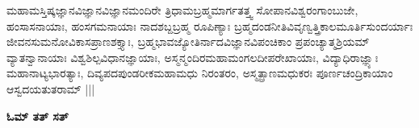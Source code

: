 ಮಹಾಮಸ್ತಿಷ್ಕಜ್ಞಾನವಿಜ್ಞಾನವಿಜ್ಞಾನಮಂದಿರೇ ತ್ರಿಧಾಮಬ್ರಹ್ಮಮಾರ್ಗತತ್ತ್ವ  ಸೋಪಾನವಿಶ್ವರಂಗಾಂಬುಜೇ, ಹಂಸಾಸನಾಯಾಃ, ಹಂಸಗಮನಾಯಾಃ ನಾದಶಬ್ದಬ್ರಹ್ಮ ರೂಪಿಣ್ಯಾಃ ಬ್ರಹ್ಮದಂಡನೀತಿವಿವೃಣ್ವತ್ತ್ರಿಕಾಲಮೂರ್ತಿಸುಂದರ್ಯಾಃ ಜೀವನಸುಮನೋವಿಕಾಸಪ್ರಾಣಶಕ್ತ್ಯಾಃ, ಬ್ರಹ್ಮಭಾವಜ್ಯೋತಿರ್ನಾದವಿಜ್ಞಾನವಿಪಂಚಿಕಾಂ ಪ್ರಪಂಚ್ಯಾತ್ಮಶ್ರಿಯಮ್ ವ್ಯಾತನ್ವಾನಾಯಾಃ ವಿಶ್ವಶಿಲ್ಪವಿಧಾನಜ್ಞಾಯಾಃ, ಅಸ್ಮನ್ಮಂದಿರಮಹಾಮಂಗಲದೀಪರೇಖಾಯಾಃ, ವಿದ್ಯಾಧಿರಾಜ್ಞ್ಯಾಃ ಮಹಾನಾಟ್ಯಭಾರತ್ಯಾಃ, ದಿವ್ಯಪದಪುಂಡರೀಕಮಹಾಮಧು ನಿರಂತರಂ, ಅಸ್ಮತ್ಪ್ರಾಣಮಧುಕರಃ ಪೂರ್ಣಚಂದ್ರಿಕಾಯಾಂ ಆಸ್ವದಯತುತರಾಮ್ |||

\vskip 30pt

\centerline{\bf ಓಮ್ ತತ್ ಸತ್}


